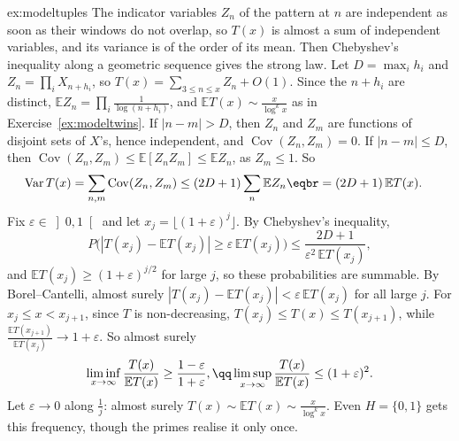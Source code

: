 \begin{solution}{ex:modeltuples}
\idea The indicator variables $Z_n$ of the pattern at $n$ are independent as soon as their windows do not overlap, so $T(x)$ is almost a sum of independent variables, and its variance is of the order of its mean.
Then Chebyshev's inequality along a geometric sequence gives the strong law.
\writeup Let $D=\max_ih_i$ and $Z_n=\prod_iX_{n+h_i}$, so $T(x)=\sum_{3\le n\le x}Z_n+O(1)$. Since the $n+h_i$ are distinct, $\mathbb EZ_n=\prod_i\frac1{\log(n+h_i)}$, and
$\mathbb ET(x)\sim\frac x{\log^kx}$ as in Exercise~\ref{ex:modeltwins}. If $|n-m|>D$, then $Z_n$ and $Z_m$ are functions of disjoint sets of $X$'s, hence independent, and $\operatorname{Cov}(Z_n,Z_m)=0$.
If $|n-m|\le D$, then $\operatorname{Cov}(Z_n,Z_m)\le\mathbb E[Z_nZ_m]\le\mathbb EZ_n$, as $Z_m\le1$. So
\[
\begin{aligned}\operatorname{Var}T(x)&=\sum_{n,m}\operatorname{Cov}(Z_n,Z_m)\le(2D+1)\sum_n\mathbb EZ_n\eqbr=(2D+1)\,\mathbb ET(x).\end{aligned}
\]
Fix $\varepsilon\in\left]0,1\right[$ and let $x_j=\lfloor(1+\varepsilon)^j\rfloor$. By Chebyshev's inequality,
\[
P\bigl(|T(x_j)-\mathbb ET(x_j)|\ge\varepsilon\,\mathbb ET(x_j)\bigr)\le\frac{2D+1}{\varepsilon^2\,\mathbb ET(x_j)},
\]
and $\mathbb ET(x_j)\ge(1+\varepsilon)^{j/2}$ for large $j$, so these probabilities are summable. By Borel--Cantelli, almost surely $|T(x_j)-\mathbb ET(x_j)|<\varepsilon\,\mathbb ET(x_j)$ for all large $j$.
For $x_j\le x<x_{j+1}$, since $T$ is non-decreasing, $T(x_j)\le T(x)\le T(x_{j+1})$, while $\frac{\mathbb ET(x_{j+1})}{\mathbb ET(x_j)}\to1+\varepsilon$. So almost surely
\[
\begin{gathered}\liminf_{x\to\infty}\frac{T(x)}{\mathbb ET(x)}\ge\frac{1-\varepsilon}{1+\varepsilon},\qq\limsup_{x\to\infty}\frac{T(x)}{\mathbb ET(x)}\le(1+\varepsilon)^2.\end{gathered}
\]
Let $\varepsilon\to0$ along $\frac1j$: almost surely $T(x)\sim\mathbb ET(x)\sim\frac x{\log^kx}$. Even $H=\{0,1\}$ gets this frequency, though the primes realise it only once.
\end{solution}

